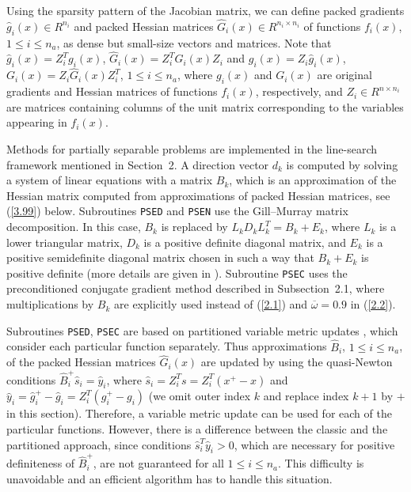 \documentclass{esub2acm}
\begin{document}
Using the sparsity pattern of the Jacobian matrix, we can define packed
gradients $\hat{g}_i(x) \in R^{n_i}$ and packed Hessian matrices
$\hat{G}_i(x) \in R^{n_i \times n_i}$ of functions $f_i(x)$,
$1 \leq i \leq n_a$, as dense but small-size vectors and matrices. Note
that $\hat{g}_i(x) = Z_i^T g_i(x)$, $\hat{G}_i(x) = Z_i^T G_i(x) Z_i$ and
$g_i(x)= Z_i \hat{g}_i(x)$, $G_i(x) = Z_i \hat{G}_i(x) Z_i^T$,
$1 \leq i \leq n_a$, where $g_i(x)$ and $G_i(x)$ are original gradients
and Hessian matrices of functions $f_i(x)$, respectively,  and
$Z_i \in R^{n \times n_i}$ are matrices containing columns of the
unit matrix corresponding to the variables appearing in $f_i(x)$.

Methods for partially separable problems are implemented in the line-search
framework mentioned in Section~2. A direction vector $d_k$ is computed
by solving a system of linear equations with a matrix $B_k$, which is an
approximation of the Hessian matrix computed from approximations of packed
Hessian matrices, see (\ref{3.99}) below.
Subroutines {\tt PSED} and {\tt PSEN} use the Gill--Murray matrix decomposition.
In this case, $B_k$ is replaced by $L_k D_k L_k^T = B_k + E_k$, where $L_k$ is
a lower triangular matrix, $D_k$ is a positive definite diagonal matrix, and
$E_k$ is a positive semidefinite diagonal matrix chosen in such a way that
$B_k + E_k$ is positive definite (more details are given in \cite{gim1}).
Subroutine {\tt PSEC} uses the preconditioned conjugate gradient method
described in Subsection~2.1, where multiplications by $B_k$ are explicitly
used instead of (\ref{2.1}) and $\overline{\omega} = 0.9$ in (\ref{2.2}).

\vspace{5mm}


\vspace{3mm}

Subroutines {\tt PSED}, {\tt PSEC} are based on partitioned variable metric
updates \cite{grt1}, which consider each particular function separately.
Thus approximations $\hat{B}_i$, $1 \leq i \leq n_a$, of the packed Hessian
matrices $\hat{G}_i(x)$ are updated by using the quasi-Newton conditions
$\hat{B}_i^+ \hat{s}_i = \hat{y}_i$, where $\hat{s}_i = Z_i^T s = Z_i^T (x^+ - x)$
and $\hat{y}_i = \hat{g}_i^+ - \hat{g}_i = Z_i^T (g_i^+ - g_i)$
(we omit outer index $k$ and replace index $k+1$ by $+$ in this section).
Therefore, a variable metric update can be used for each of the particular
functions. However, there is a difference between the classic and the
partitioned approach, since conditions $\hat{s}_i^T \hat{y}_i > 0$,
which are necessary for positive definiteness of $\hat{B}_i^+$, are not guaranteed
for all $1 \leq i \leq n_a$. This difficulty is unavoidable and an efficient
algorithm has to handle this situation.
\end{document}
